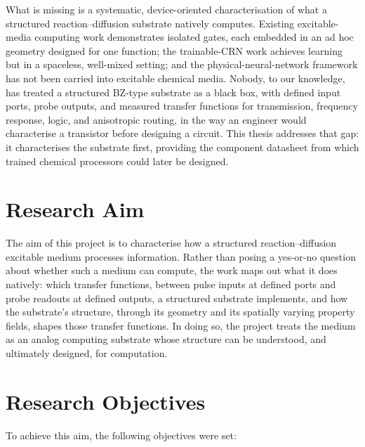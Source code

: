 What is missing is a systematic, device-oriented characterisation of what a structured reaction--diffusion substrate natively computes. Existing excitable-media computing work demonstrates isolated gates, each embedded in an ad hoc geometry designed for one function; the trainable-CRN work achieves learning but in a spaceless, well-mixed setting; and the physical-neural-network framework has not been carried into excitable chemical media. Nobody, to our knowledge, has treated a structured BZ-type substrate as a black box, with defined input ports, probe outputs, and measured transfer functions for transmission, frequency response, logic, and anisotropic routing, in the way an engineer would characterise a transistor before designing a circuit. This thesis addresses that gap: it characterises the substrate first, providing the component datasheet from which trained chemical processors could later be designed.

\section{Research Aim}
\label{sec:aim}

The aim of this project is to characterise how a structured reaction--diffusion excitable medium processes information. 
Rather than posing a yes-or-no question about whether such a medium can compute, the work maps out what it does natively: which transfer functions, between pulse inputs at defined ports and probe readouts at defined outputs, a structured substrate implements, and how the substrate's structure, through its geometry and its spatially varying property fields, shapes those transfer functions. 
In doing so, the project treats the medium as an analog computing substrate whose structure can be understood, and ultimately designed, for computation.

\section{Research Objectives}
\label{sec:objectives}

To achieve this aim, the following objectives were set:

